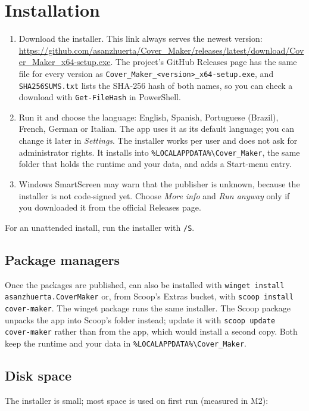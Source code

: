 \documentclass{covermaker}
\begin{document}
\chapter{Installation}
\begin{enumerate}
  \item Download the installer. This link always serves the newest version:
  \url{https://github.com/asanzhuerta/Cover_Maker/releases/latest/download/Cover_Maker_x64-setup.exe}.
  The project's GitHub Releases page has the same file for every version as
  \texttt{Cover\_Maker\_<version>\_x64-setup.exe}, and
  \texttt{SHA256SUMS.txt} lists the SHA-256 hash of both names, so you can
  check a download with \texttt{Get-FileHash} in PowerShell.
  \item Run it and choose the language: English, Spanish, Portuguese (Brazil),
  French, German or Italian. The app uses it as
  its default language; you can change it later in \emph{Settings}. The
  installer works per user and does not ask for administrator rights. It installs into
  \texttt{\%LOCALAPPDATA\%\textbackslash Cover\_Maker}, the same folder that
  holds the runtime and your data, and adds a Start-menu entry.
  \item Windows SmartScreen may warn that the publisher is unknown, because
  the installer is not code-signed yet. Choose \emph{More info} and \emph{Run
  anyway} only if you downloaded it from the official Releases page.
\end{enumerate}

For an unattended install, run the installer with \texttt{/S}.

\section{Package managers}
Once the packages are published, \CM{} can also be installed with
\texttt{winget install asanzhuerta.CoverMaker} or, from Scoop's Extras
bucket, with \texttt{scoop install cover-maker}. The winget package runs the
same installer. The Scoop package unpacks the app into Scoop's folder instead;
update it with \texttt{scoop update cover-maker} rather than from the app,
which would install a second copy. Both keep the runtime and your data in
\texttt{\%LOCALAPPDATA\%\textbackslash Cover\_Maker}.

\section{Disk space}
The installer is small; most space is used on first run (measured in M2):
\end{document}
